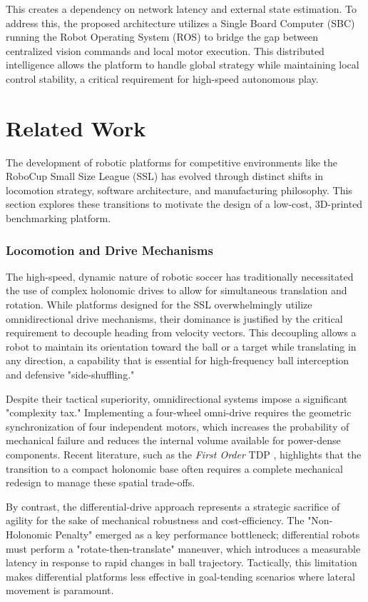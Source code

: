 \documentclass[a4paper,twoside,12pt]{report}
\begin{document}
This creates a dependency on network latency and external state estimation. 
To address this, the proposed architecture utilizes a Single Board Computer (SBC) running the Robot Operating System (ROS) to bridge the gap between centralized vision commands and local motor execution.\cite{smit2011development} \cite{joseph2018robot} 
This distributed intelligence allows the platform to handle global strategy while maintaining local control stability, a critical requirement for high-speed autonomous play.

\chapter{Related Work}\label{chapter: related}
The development of robotic platforms for competitive environments like the RoboCup Small Size League (SSL) has evolved through distinct shifts in locomotion strategy, software architecture, and manufacturing philosophy. This section explores these transitions to motivate the design of a low-cost, 3D-printed benchmarking platform.

\subsection{Locomotion and Drive Mechanisms}

The high-speed, dynamic nature of robotic soccer has traditionally necessitated the use of complex holonomic drives to allow for simultaneous translation and rotation. 
While platforms designed for the SSL overwhelmingly utilize omnidirectional drive mechanisms, their dominance is justified by the critical requirement to decouple heading from velocity vectors. 
This decoupling allows a robot to maintain its orientation toward the ball or a target while translating in any direction, a capability that is essential for high-frequency ball interception and defensive "side-shuffling."

Despite their tactical superiority, omnidirectional systems impose a significant "complexity tax." 
Implementing a four-wheel omni-drive requires the geometric synchronization of four independent motors, which increases the probability of mechanical failure and reduces the internal volume available for power-dense components. 
Recent literature, such as the \textit{First Order} TDP \cite{liang2025first}, highlights that the transition to a compact holonomic base often requires a complete mechanical redesign to manage these spatial trade-offs.

By contrast, the differential-drive approach represents a strategic sacrifice of agility for the sake of mechanical robustness and cost-efficiency. 
The "Non-Holonomic Penalty" emerged as a key performance bottleneck; differential robots must perform a "rotate-then-translate" maneuver, which introduces a measurable latency in response to rapid changes in ball trajectory. 
Tactically, this limitation makes differential platforms less effective in goal-tending scenarios where lateral movement is paramount. 
\end{document}
